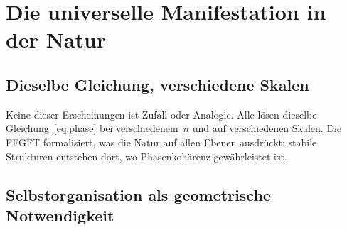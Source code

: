 \section{Die universelle Manifestation in der Natur}

\subsection{Dieselbe Gleichung, verschiedene Skalen}

\begin{table}[H]
\centering
\caption{Manifestation der Phasenbedingung auf verschiedenen Skalen}
\smallskip
{}
\end{table}

\begin{keybox}
Keine dieser Erscheinungen ist Zufall oder Analogie. Alle lösen
dieselbe Gleichung~\eqref{eq:phase} bei verschiedenem~$n$
und auf verschiedenen Skalen. Die FFGFT formalisiert, was die Natur
auf allen Ebenen ausdrückt: stabile Strukturen entstehen dort, wo
Phasenkohärenz gewährleistet ist.
\end{keybox}

\subsection{Selbstorganisation als geometrische Notwendigkeit}

